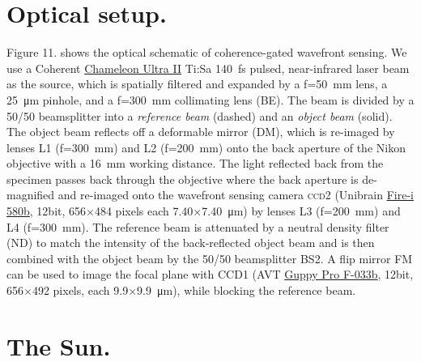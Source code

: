 \section[Optical setup]{Optical setup. \hyperlink{toc}{\hyperback}}

Figure 11. shows the optical schematic of coherence-gated wavefront sensing. We use a Coherent \href{http://www.coherent.com/products/?1842/Chameleon-Ultra-Family}{Chameleon Ultra II} Ti:Sa \SI{140}{\femto\second} pulsed, near-infrared laser beam as the source, which is spatially filtered and expanded by a f=\SI{50}{\milli\meter} lens, a \SI{25}{\micro\meter} pinhole, and a f=\SI{300}{\milli\meter} collimating lens (BE). The beam is divided by a 50/50 beamsplitter into a \emph{reference beam} (dashed) and an \emph{object beam} (solid). The object beam reflects off a deformable mirror (DM), which is re-imaged by lenses L1 (f=\SI{300}{\milli\meter}) and L2 (f=\SI{200}{\milli\meter}) onto the back aperture of the Nikon objective with a \SI{16}{\milli\meter} working distance. The  light reflected back from the specimen passes back through the objective where the back aperture is de-magnified  and re-imaged onto the wavefront sensing camera \textsc{ccd}2 (Unibrain \href{http://www.unibrain.com/products/VisionImg/Fire_i_580.htm}{Fire-i 580b}, \num{12}bit,  \num{656}$\times$\num{484} pixels each \num{7.40}$\times$\SI{7.40}{\micro\meter}) by lenses L3 (f=\SI{200}{\milli\meter}) and L4 (f=\SI{300}{\milli\meter}). The reference beam is attenuated by a neutral density filter (ND) to match the intensity of the back-reflected object beam and is then combined with the object beam by the 50/50 beamsplitter BS2. A flip mirror FM can be used to image the focal plane with CCD1 (AVT \href{http://www.alliedvisiontec.com/us/products/cameras/firewire/guppy-pro/f-033bc.html}{Guppy Pro F-033b}, \num{12}bit, \num{656}$\times$\num{492} pixels, each \num{9.9}$\times$\SI{9.9}{\micro\meter}), while blocking the reference beam.

\section[The Sun]{The Sun. \hyperlink{toc}{\hyperback}}

